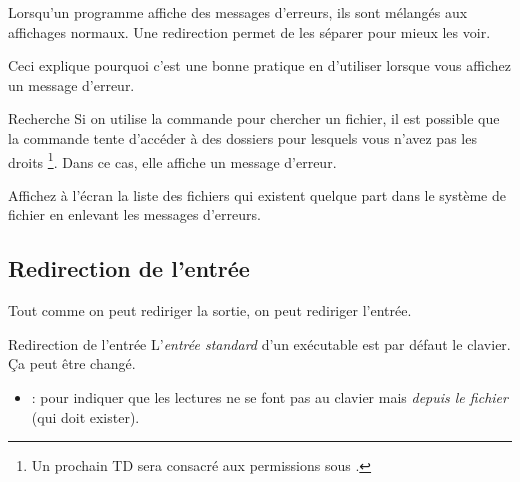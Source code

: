 \documentclass[a4paper,11pt]{style-esi/td}
\begin{document}
		Lorsqu'un programme affiche des messages d'erreurs,
		ils sont mélangés aux affichages normaux.
		Une redirection permet de les séparer pour mieux les voir.

		Ceci explique pourquoi c'est une bonne pratique en 
		d'utiliser  lorsque vous affichez un message d'erreur.

		\begin{Exercice}{Recherche}
			Si on utilise la commande  pour chercher un fichier,
			il est possible que la commande tente d'accéder à des dossiers
			pour lesquels vous n'avez pas les droits%
			\footnote{%
				Un prochain TD sera consacré aux permissions sous .
			}.
			Dans ce cas, elle affiche un message d'erreur.

			Affichez à l'écran la liste des fichiers 
			qui existent quelque part dans le système de fichier
			en enlevant les messages d'erreurs.
		\end{Exercice}

	\subsection{Redirection de l'entrée}

		Tout comme on peut rediriger la sortie,
		on peut rediriger l'entrée.

		\begin{theorie}{Redirection de l'entrée}
			L'\emph{entrée standard} d'un exécutable est par défaut le clavier.
			\c Ca peut être changé. 
			\begin{itemize}
			\item {} : 
				pour indiquer que les lectures ne se font pas au clavier
				mais \emph{depuis le fichier} (qui doit exister).
			\end{itemize}
		\end{theorie}
\end{document}
